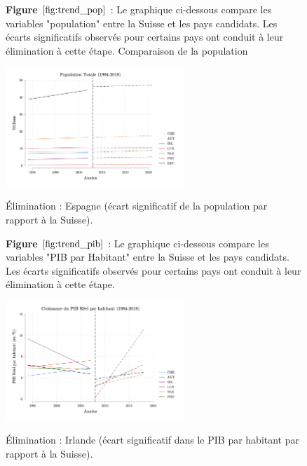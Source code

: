         \begin{figure}[H]
\textbf{Figure {$\ref{fig:trend_pop}$}} : Le graphique ci-dessous compare les variables "population" entre la Suisse et les pays candidats. Les écarts significatifs observés pour certains pays ont conduit à leur élimination à cette étape. Comparaison de la population


        \centering
        \includegraphics[width=0.6\textwidth]{Article/images/trend_population.png}
        \caption{}
        \label{fig:trend_pop}
\begin{center}
    Élimination : Espagne (écart significatif de la population par rapport à la Suisse).
\end{center}
    \end{figure}

    

\vspace{1cm}


        \begin{figure}[H]
\textbf{Figure {$\ref{fig:trend_pib}$}} : Le graphique ci-dessous compare les variables "PIB par Habitant" entre la Suisse et les pays candidats. Les écarts significatifs observés pour certains pays ont conduit à leur élimination à cette étape.


        \centering
        \includegraphics[width=0.6\textwidth]{Article/images/trend_pib.png}
        \caption{}
        \label{fig:trend_pib}
\begin{center}
Élimination : Irlande (écart significatif dans le PIB par habitant par rapport à la Suisse).
\end{center}
    \end{figure}

